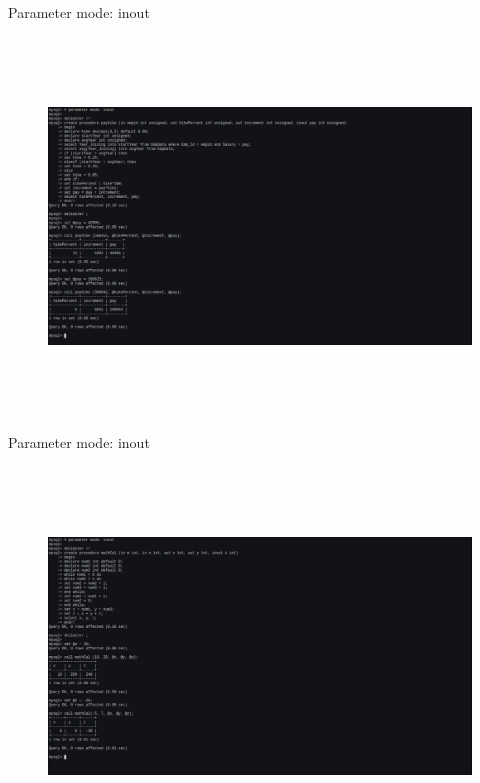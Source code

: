 \documentclass[a4paper,11pt,openright]{report}
\begin{document}
{\footnotesize Parameter mode: inout}
\begin{figure}[ht!]
\includegraphics[width=20cm,height=10cm,keepaspectratio]{image5.pdf}
\centering
\end{figure}

\vspace{20px}

{\footnotesize Parameter mode: inout}
\begin{figure}[ht!]
\includegraphics[width=20cm,height=10cm,keepaspectratio]{image6.pdf}
\centering
\end{figure}
\end{document}
